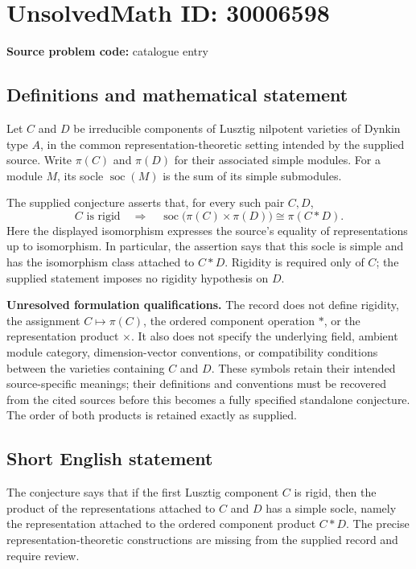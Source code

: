 \documentclass[11pt]{article}
\begin{document}
\section*{UnsolvedMath ID: 30006598}
\textbf{Source problem code:} catalogue entry
\subsection{Definitions and mathematical statement}
Let \(C\) and \(D\) be irreducible components of Lusztig nilpotent varieties of Dynkin type \(A\), in the common representation-theoretic setting intended by the supplied source. Write \(\pi(C)\) and \(\pi(D)\) for their associated simple modules. For a module \(M\), its socle \(\operatorname{soc}(M)\) is the sum of its simple submodules.

The supplied conjecture asserts that, for every such pair \(C,D\),
\[
 C\text{ is rigid}\quad\Longrightarrow\quad
 \operatorname{soc}\bigl(\pi(C)\times\pi(D)\bigr)
 \cong \pi(C*D).
\]
Here the displayed isomorphism expresses the source's equality of representations up to isomorphism. In particular, the assertion says that this socle is simple and has the isomorphism class attached to \(C*D\). Rigidity is required only of \(C\); the supplied statement imposes no rigidity hypothesis on \(D\).

\textbf{Unresolved formulation qualifications.} The record does not define rigidity, the assignment \(C\mapsto\pi(C)\), the ordered component operation \(*\), or the representation product \(\times\). It also does not specify the underlying field, ambient module category, dimension-vector conventions, or compatibility conditions between the varieties containing \(C\) and \(D\). These symbols retain their intended source-specific meanings; their definitions and conventions must be recovered from the cited sources before this becomes a fully specified standalone conjecture. The order of both products is retained exactly as supplied.
\subsection{Short English statement}
The conjecture says that if the first Lusztig component \(C\) is rigid, then the product of the representations attached to \(C\) and \(D\) has a simple socle, namely the representation attached to the ordered component product \(C*D\). The precise representation-theoretic constructions are missing from the supplied record and require review.
\end{document}
